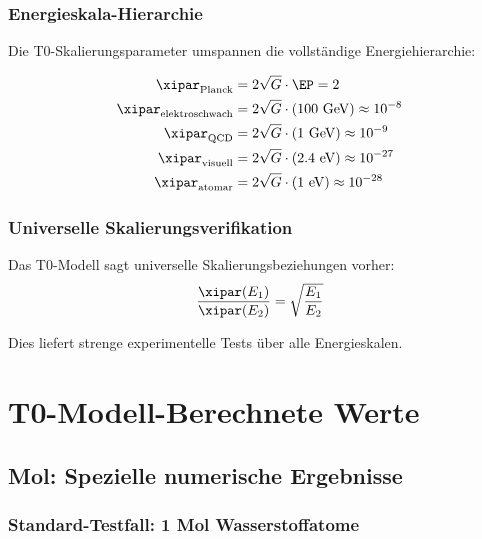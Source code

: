 	\subsubsection{Energieskala-Hierarchie}
	\label{subsubsec:energieskala_hierarchie}
	
	Die T0-Skalierungsparameter umspannen die vollständige Energiehierarchie:
	
	\begin{align}
		\xipar_{\text{Planck}} &= 2\sqrt{G} \cdot \EP = 2 \\
		\xipar_{\text{elektroschwach}} &= 2\sqrt{G} \cdot (100 \text{ GeV}) \approx 10^{-8} \\
		\xipar_{\text{QCD}} &= 2\sqrt{G} \cdot (1 \text{ GeV}) \approx 10^{-9} \\
		\xipar_{\text{visuell}} &= 2\sqrt{G} \cdot (2.4 \text{ eV}) \approx 10^{-27} \\
		\xipar_{\text{atomar}} &= 2\sqrt{G} \cdot (1 \text{ eV}) \approx 10^{-28}
	\end{align}
	
	\subsubsection{Universelle Skalierungsverifikation}
	\label{subsubsec:universelle_skalierungsverifikation}
	
	Das T0-Modell sagt universelle Skalierungsbeziehungen vorher:
	\begin{equation}
		\frac{\xipar(E_1)}{\xipar(E_2)} = \sqrt{\frac{E_1}{E_2}}
		\label{eq:universeller_skalierungstest}
	\end{equation}
	
	Dies liefert strenge experimentelle Tests über alle Energieskalen.
	
	\section{T0-Modell-Berechnete Werte}
	\label{sec:t0_berechnete_werte}
	
	\subsection{Mol: Spezielle numerische Ergebnisse}
	\label{subsec:mol_numerische_ergebnisse}
	
	\subsubsection{Standard-Testfall: 1 Mol Wasserstoffatome}
	\label{subsubsec:mol_wasserstoff_test}
	
